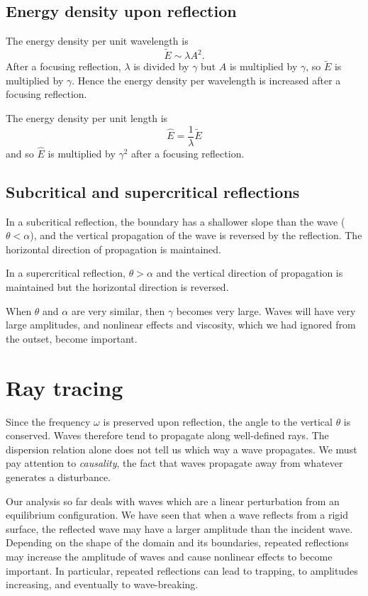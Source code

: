 \subsection{Energy density upon reflection}

The energy density per unit wavelength is 
\begin{equation}
	\tilde{E} \sim \lambda A^2.
\end{equation}
After a focusing reflection, $\lambda$ is divided by $\gamma$ but $A$ is multiplied by $\gamma$, so $\tilde{E}$ is multiplied by $\gamma$. Hence the energy density per wavelength is increased after a focusing reflection. 

The energy density per unit length is 
\begin{equation}
	\hat{E} = \frac{1}{\lambda} \tilde{E}
\end{equation}
and so $\hat{E}$ is multiplied by $\gamma^2$ after a focusing reflection.

\subsection{Subcritical and supercritical reflections}

In a subcritical reflection, the boundary has a shallower slope than the wave
($\theta < \alpha$), and the vertical propagation of the wave is reversed by the
reflection. The horizontal direction of propagation is maintained.

In a supercritical reflection, $\theta > \alpha$ and the vertical direction of
propagation is maintained but the horizontal direction is reversed. 

When $\theta$ and $\alpha$ are very similar, then $\gamma$ becomes very large.
Waves will have very large amplitudes, and nonlinear effects and viscosity,
which we had ignored from the outset, become important. 

\section{Ray tracing}

Since the frequency $\omega$ is preserved upon reflection, the angle to the vertical $\theta$ is conserved. Waves therefore tend to propagate along well-defined rays. The dispersion relation alone does not tell us which way a wave propagates. We must pay attention to \textit{causality}, the fact that waves propagate away from whatever generates a disturbance. 

Our analysis so far deals with waves which are a linear perturbation from an equilibrium configuration. We have seen that when a wave reflects from a rigid surface, the reflected wave may have a larger amplitude than the incident wave. Depending on the shape of the domain and its boundaries, repeated reflections may increase the amplitude of waves and cause nonlinear effects to become important. In particular, repeated reflections can lead to trapping, to amplitudes increasing, and eventually to wave-breaking. 

